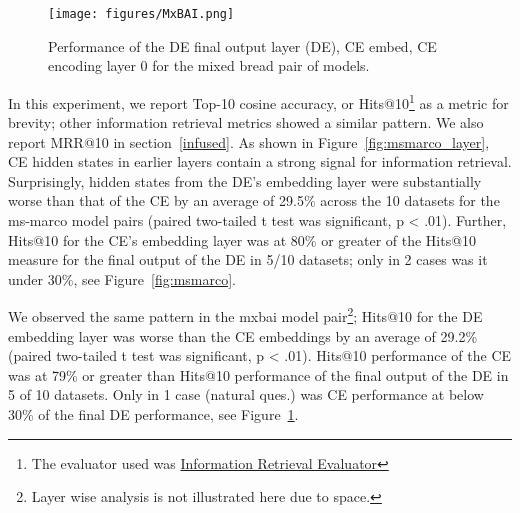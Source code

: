 \begin{figure}[!t]
    \centering
    \texttt{[image: figures/MxBAI.png]}
    \caption{Performance of the DE final output layer (DE), CE embed, CE encoding layer 0 for the mixed bread pair of models.}
    \label{fig:mixed-bread}
\end{figure}
In this experiment, we report Top-10 cosine accuracy, or Hits@10\footnote{The evaluator used was    \href{https://sbert.net/docs/package_reference/sentence_transformer/evaluation.html}{Information Retrieval Evaluator}} 
as a metric for brevity; other information retrieval metrics showed a similar pattern. We also report MRR@10 in section~\ref{infused}.  As shown in Figure~\ref{fig:msmarco_layer}, CE hidden states in earlier layers contain a strong signal for information retrieval.  Surprisingly, hidden states from the DE's embedding layer were substantially worse than that of the CE by an average of 29.5\% across the 10 datasets for the ms-marco model pairs (paired two-tailed t test was significant, p < .01).  Further, Hits@10 for the CE's embedding layer was at 80\% or greater of the Hits@10 measure for the final output of the DE in 5/10 datasets; only in 2 cases was it under 30\%, see Figure~\ref{fig:msmarco}.

We observed the same pattern in the mxbai model pair\footnote{Layer wise analysis is not illustrated here due to space.}; Hits@10 for the DE embedding layer was worse than the CE embeddings by an average of 29.2\% (paired two-tailed t test was significant, p < .01).  Hits@10 performance of the CE was at 79\% or greater than Hits@10 performance of the final output of the DE in 5 of 10 datasets. Only in 1 case (natural ques.) was CE performance at below 30\% of the final DE performance, see Figure~\ref{fig:mixed-bread}. 


